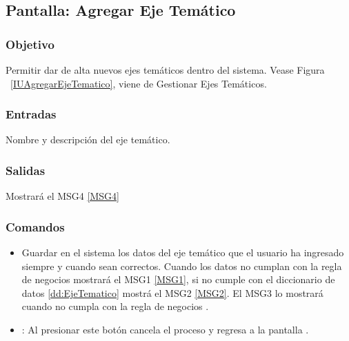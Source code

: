 \subsection{Pantalla: Agregar Eje Temático}

\subsubsection{Objetivo}
Permitir dar de alta nuevos ejes temáticos dentro del sistema.  Vease Figura ~\ref{IUAgregarEjeTematico}, viene de Gestionar Ejes Temáticos.



\subsubsection{Entradas}
Nombre y descripción del eje temático.

\subsubsection{Salidas}
Mostrará el MSG4 \ref{MSG4}

\subsubsection{Comandos}
\begin{itemize}
 \item {} Guardar en el sistema los datos del eje temático que el usuario ha ingresado siempre y cuando sean correctos. Cuando los datos no  cumplan con la regla de negocios    mostrará el MSG1 \ref{MSG1}, si no cumple con el diccionario de datos \ref{dd:EjeTematico} mostrá el MSG2 \ref{MSG2}. El MSG3 lo mostrará cuando no cumpla con la regla de negocios . 
 \item {}: Al presionar este botón cancela el proceso y regresa a la pantalla .

\end{itemize}



